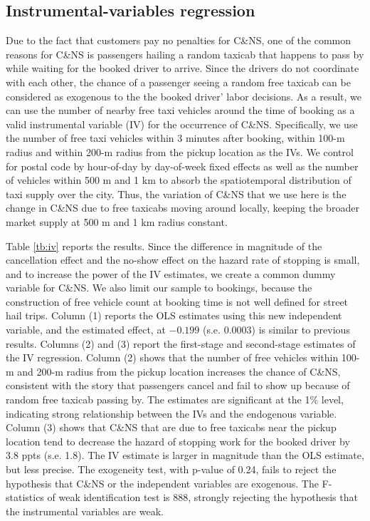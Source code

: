 \documentclass[reviewmode,AEJ]{AEA}
\begin{document}
\begin{appendices}
\begin{table}[htb]
\end{table}

\FloatBarrier
\section{Instrumental-variables regression}
\label{apx:iv}
Due to the fact that customers pay no penalties for C\&NS, one of the common reasons for C\&NS 
is passengers hailing a random taxicab that happens to pass by while waiting for the booked driver to arrive. 
Since the drivers do not coordinate with each other, the chance of a passenger seeing a random
free taxicab can be considered as exogenous to the the booked driver' labor decisions.
As a result, we can use the number of nearby free taxi vehicles around the time of 
booking as a valid instrumental variable (IV) for the occurrence of C\&NS.
Specifically, we use the number of free taxi vehicles within 3 minutes after booking, 
within 100-m radius and within 200-m radius from the pickup location as the IVs. We control for postal code by hour-of-day by day-of-week fixed effects as
well as the number of vehicles within 500 m and 1 km to absorb the spatiotemporal distribution
of taxi supply over the city. Thus, the variation of C\&NS that we use here is the change in C\&NS
due to free taxicabs moving around locally, keeping the broader market supply at 500 m and 1 km 
radius constant. 

Table \ref{tb:iv} reports the results. Since the difference in magnitude of the cancellation effect
and the no-show effect on the hazard rate of stopping is small, 
and to increase the power of the IV estimates, we create
a common dummy variable for C\&NS. We also limit our sample to bookings, because the construction
of free vehicle count at booking time is not well defined for street hail trips.
Column (1) reports the OLS estimates using this new
independent variable, and the estimated effect, at $-0.199$ (s.e. $0.0003$) is similar 
to previous results.
Columns (2) and (3) report the first-stage and second-stage estimates of the IV regression.
Column (2) shows that the number of free vehicles within 100-m and 200-m radius from 
the pickup location increases the chance of C\&NS, consistent with the story that
passengers cancel and fail to show up because of random free taxicab passing by.
The estimates are significant at the 1\% level, indicating strong relationship between the IVs
 and the endogenous variable.
Column (3) shows that C\&NS  that are due to free taxicabs near the pickup location
tend to decrease the hazard of stopping work for the booked driver by 3.8 ppts (s.e. 1.8).
The IV estimate is larger in magnitude than the OLS estimate, but less precise.
The exogeneity test, with p-value of 0.24, fails to reject the hypothesis that C\&NS or
the independent variables are exogenous. The F-statistics of weak identification test is 888, strongly rejecting the hypothesis that the instrumental variables are weak.



\end{appendices}
\end{document}
